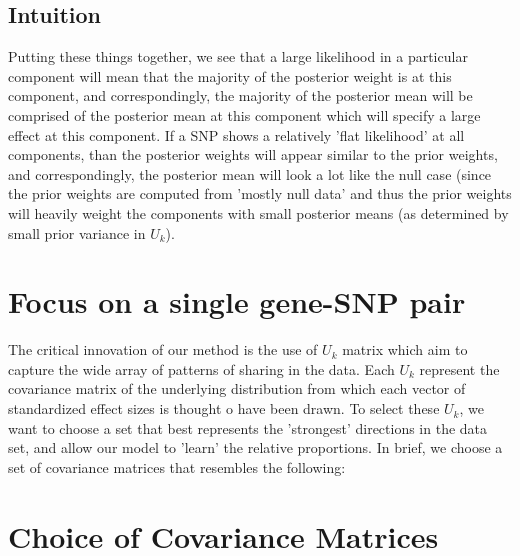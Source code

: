 \documentclass[10pt]{article}
\begin{document}
\subsection{Intuition}
Putting these things together, we see that a large likelihood in a particular component will mean that the majority of the posterior weight is at this component, and correspondingly, the majority of the posterior mean will be comprised of the posterior mean at this component which will specify a large effect at this component. If a SNP shows a relatively 'flat likelihood' at all components, than the posterior weights will appear similar to the prior weights, and correspondingly, the posterior mean will look a lot like the null case (since the prior weights are computed from 'mostly null data' and thus the prior weights will heavily weight the components with small posterior means (as determined by small prior variance in $U_{k}$).







\section{Focus on a single gene-SNP pair}

The critical innovation of our method is the use of $U_{k}$ matrix which aim to capture the wide array of patterns of sharing in the data. Each $U_{k}$ represent the covariance matrix of the underlying distribution from which each vector of standardized effect sizes is thought o have been drawn. To select these $U_{k}$, we want to choose a set that best represents the 'strongest' directions in the data set, and allow our model to 'learn' the relative proportions. In brief, we choose a set of covariance matrices that resembles the following:



\section{Choice of Covariance Matrices}
\end{document}
